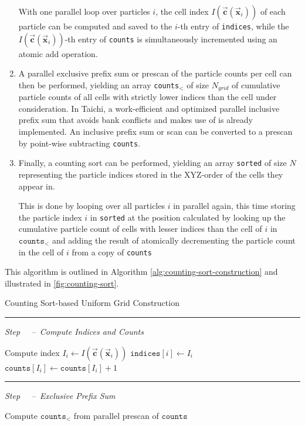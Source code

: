 \documentclass[oneside, a4paper]{book}
\newcounter{phase}[algorithm]
\newlength{\phaserulewidth}
\newcommand{\Phase}[1]{%
  \vspace{-1.25ex}
  \Statex\leavevmode\llap{\rule{\dimexpr\labelwidth+\labelsep}{\phaserulewidth}}\rule{\linewidth}{\phaserulewidth}
  \Statex\strut\refstepcounter{phase}\textit{Step ~\thephase~--~#1}%
  }
\newcommand\vek[1]{\vec{\bm{#1}}}
\newcommand\br[1]{\left(#1\right)}
\begin{document}
\begin{appendices}
\begin{enumerate}
      With one parallel loop over particles $i$, the cell index $I\br{\vek{c}(\vek{x}_i)}$ of each particle can be computed and saved to the $i$-th entry of \texttt{indices}, while the $I\br{\vek{c}(\vek{x}_i)}$-th entry of \texttt{counts} is simultaneously incremented using an atomic add operation.
      \item A parallel exclusive prefix sum or prescan of the particle counts per cell can then be performed, yielding an array \texttt{counts}$_<$ of size $N_{grid}$ of cumulative particle counts of all cells with strictly lower indices than the cell under consideration. In Taichi, a work-efficient and optimized parallel inclusive prefix sum that avoids bank conflicts \autocite{parallel-prefix-scan} and makes use of \autocite[Blelloch scans]{blelloch-scans} is already implemented. An inclusive prefix sum or scan can be converted to a prescan by point-wise subtracting \texttt{counts}.
      \item Finally, a counting sort can be performed, yielding an array \texttt{sorted} of size $N$ representing the particle indices stored in the XYZ-order of the cells they appear in.
      
      This is done by looping over all particles $i$ in parallel again, this time storing the particle index $i$ in \texttt{sorted} at the position calculated by looking up the cumulative particle count of cells with lesser indices than the cell of $i$ in $\texttt{counts}_<$ and adding the result of atomically decrementing the particle count in the cell of $i$ from a copy of \texttt{counts}
    \end{enumerate}
    This algorithm is outlined in Algorithm \ref{alg:counting-sort-construction} and illustrated in \autoref{fig:counting-sort}.

    \begin{algorithm}
      \caption{Counting Sort-based Uniform Grid Construction}
      \label{alg:counting-sort-construction}
      \begin{algorithmic}[1]
        \Phase{Compute Indices and Counts}
          \State Compute index $I_i \gets I\br{\vek{c}\br{\vek{x}_i}}$
          \State $\texttt{indices}\left[i\right] \gets I_i$
          \State $\texttt{counts}\left[I_i\right] \gets \texttt{counts}\left[I_i\right] + 1$
        \EndFor
        
        \Phase{Exclusive Prefix Sum}
        \State Compute $\texttt{counts}_<$ from parallel prescan of $\texttt{counts}$
    

\end{algorithmic}
\end{algorithm}
\end{appendices}
\end{document}
